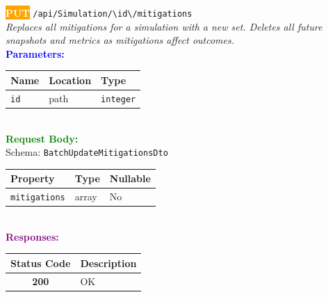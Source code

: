 \begin{tcolorbox}[
    colback=orange!5,
    colframe=orange,
    arc=2mm,
    boxrule=1pt,
    left=5pt,
    right=5pt,
    top=5pt,
    bottom=5pt
]
\noindent\colorbox{orange}{\textcolor{white}{\textbf{PUT}}} 
\texttt{\large /api/Simulation/\textbackslash{}{id\textbackslash{}}/mitigations}\\[0.3em]
\textit{Replaces all mitigations for a simulation with a new set.
Deletes all future snapshots and metrics as mitigations affect outcomes.}\\[0.3em]
\vspace{0.3em}
\textbf{\textcolor{blue}{Parameters:}}\\[0.2em]
\begin{tabular}{|l|l|l|}
\hline
\rowcolor{gray!20}
\textbf{Name} & \textbf{Location} & \textbf{Type} \\ \hline
\texttt{id} & path & \texttt{integer} \\ \hline
\end{tabular}\\[0.5em]
\vspace{0.3em}
\textbf{\textcolor{green}{Request Body:}}\\[0.2em]
Schema: \texttt{BatchUpdateMitigationsDto}\\[0.3em]
\begin{tabular}{|l|l|l|}
\hline
\rowcolor{green!10}
\textbf{Property} & \textbf{Type} & \textbf{Nullable} \\ \hline
\texttt{mitigations} & array & No \\ \hline
\end{tabular}\\[0.5em]
\vspace{0.3em}
\textbf{\textcolor{purple}{Responses:}}\\[0.2em]
\begin{tabular}{|c|p{10cm}|}
\hline
\rowcolor{gray!20}
\textbf{Status Code} & \textbf{Description} \\ \hline
\colorbox{green!20}{\textbf{200}} & OK \\ \hline
\end{tabular}
\end{tcolorbox}
\vspace{0.5em}

